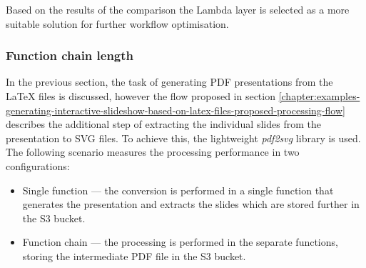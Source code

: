 Based on the results of the comparison the Lambda layer is selected as a more suitable solution for further workflow optimisation.

\subsubsection{Function chain length}

In the previous section, the task of generating PDF presentations from the LaTeX files is discussed, however the flow proposed in section \ref{chapter:examples-generating-interactive-slideshow-based-on-latex-files-proposed-processing-flow} describes the additional step of extracting the individual slides from the presentation to SVG files. To achieve this, the lightweight \textit{pdf2svg} \cite{pdf2svg} library is used. The following scenario measures the processing performance in two configurations:

\begin{itemize}
   \item Single function --- the conversion is performed in a single function that generates the presentation and extracts the slides which are stored further in the S3 bucket.
   \item Function chain --- the processing is performed in the separate functions, storing the intermediate PDF file in the S3 bucket.
\end{itemize}

\datasetChainVsSingle

